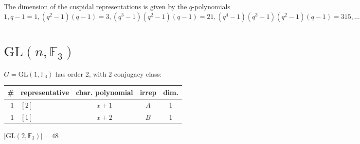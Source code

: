 \documentclass[11pt,oneside]{article}
\newcommand{\GL}{\mathrm{GL}}
\newcommand{\Field}{\mathbb{F}}
\begin{document}
The dimension of the cuspidal representations is given by the $q$-polynomials
$
1, q-1=1, 
(q^2-1)(q-1)=3, 
(q^3-1)(q^2-1)(q-1)=21, 
(q^4-1)(q^3-1)(q^2-1)(q-1)=315, ...
$


\section{$\GL(n,\Field_3)$}

$G=\GL(1,\Field_3)$ has order 2, with 2 conjugacy class:
\begin{center}
\begin{tabular}{r|l|c|c|c}
\# & representative & char. polynomial & irrep & dim. \\
\hline
1 & $[2]$           & $x+1$            & $A$   & 1    \\
1 & $[1]$           & $x+2$            & $B$   & 1    \\
\end{tabular}
\end{center}

$|\GL(2,\Field_3)|=48$


\end{document}
